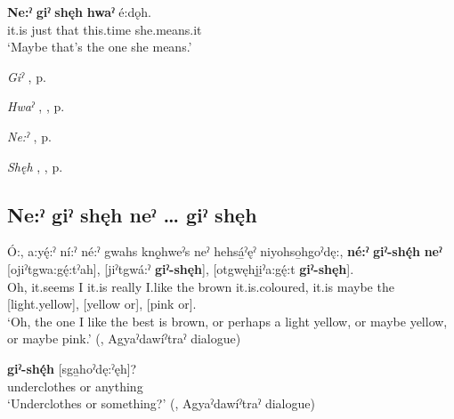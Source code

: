 \ea
\label{ex:npar62}
\gll \textbf{Ne:ˀ} \textbf{giˀ} \textbf{shęh} \textbf{hwaˀ} é:dǫh.\\
it.is just that this.time she.means.it\\
\glt ‘Maybe that’s the one she means.’
\z

\begin{CayugaRelated}
\item \textit{Giˀ} , p. \pageref{p:[giˀ]}\\
\item \textit{Hwaˀ} , , p. \pageref{p:[hwaˀ]}\\
\item \textit{Ne:ˀ} , p. \pageref{p:[ne:ˀ] `it is’}\\
\item \textit{Shęh} , , p. \pageref{p:[shęh] `because’}
\end{CayugaRelated}

\subsection*{\textbf{Ne:ˀ giˀ shęh neˀ … giˀ shęh} } \label{p:[ne:ˀ giˀ shęh neˀ … giˀ shęh]}

\ea
\label{ex:npar63}
\gll Ó:, a:yę́:ˀ ní:ˀ né:ˀ gwahs knǫ̱hweˀs neˀ hehsá̱ˀęˀ niyohso̱hgoˀdę:, \textbf{né:ˀ} \textbf{giˀ-shę́h} \textbf{neˀ} [ojiˀtgwa:gę́:tˀah], [jiˀtgwá:ˀ \textbf{giˀ-shęh}], [otgwęhji̱ˀa:gę́:t \textbf{giˀ-shęh}].\\
Oh, it.seems I it.is really I.like the brown it.is.coloured, it.is maybe the [light.yellow], [yellow or], [pink or].\\
\glt ‘Oh, the one I like the best is brown, or perhaps a light yellow, or maybe yellow, or maybe pink.’ (\cite[225]{mithun_watewayestanih_1984}, Agyaˀdawíˀtraˀ dialogue)
\z

\ea
\label{ex:npar64}
 \textbf{giˀ-shę́h} [sga̱hoˀdę:ˀęh]?\\
underclothes or anything\\
\glt ‘Underclothes or something?’ (\cite[225]{mithun_watewayestanih_1984}, Agyaˀdawíˀtraˀ dialogue)
\z

